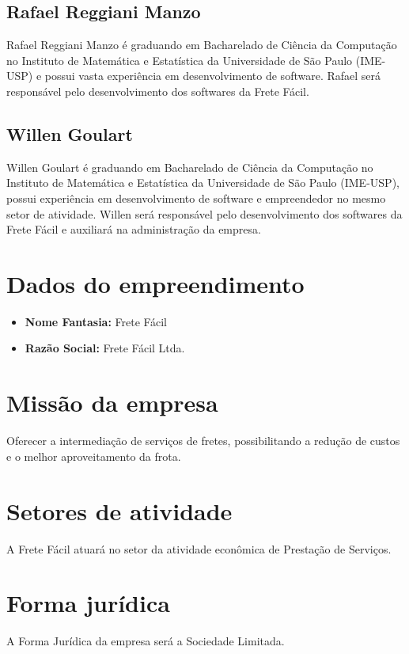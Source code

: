 \subsection{Rafael Reggiani Manzo}
Rafael Reggiani Manzo é graduando em Bacharelado de Ciência da Computação no Instituto de Matemática e Estatística da Universidade de São Paulo (IME-USP) e possui vasta experiência em desenvolvimento de software. Rafael será responsável pelo desenvolvimento dos softwares da Frete Fácil.

\subsection{Willen Goulart}
Willen Goulart é graduando em Bacharelado de Ciência da Computação no Instituto de Matemática e Estatística da Universidade de São Paulo (IME-USP), possui experiência em desenvolvimento de software e empreendedor no mesmo setor de atividade. Willen será responsável pelo desenvolvimento dos softwares da Frete Fácil e auxiliará na administração da empresa.
        
\section{Dados do empreendimento}

\begin{itemize}
  \item \textbf{Nome Fantasia:} Frete Fácil
  \item \textbf{Razão Social:} Frete Fácil Ltda.
\end{itemize}

\section{Missão da empresa}
Oferecer a intermediação de serviços de fretes, possibilitando a redução de custos e o melhor aproveitamento da frota.

\section{Setores de atividade}
A Frete Fácil atuará no setor da atividade econômica de Prestação de Serviços.

\section{Forma jurídica}
A Forma Jurídica da empresa será a Sociedade Limitada.

